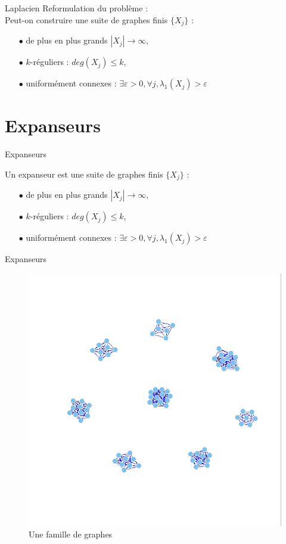 \begin{frame}{Laplacien}
Reformulation du problème :\\
Peut-on construire une suite de graphes finis $\{X_j\}$ :
\begin{itemize}
\item[$\bullet$] de plus en plus grands $|X_j|\rightarrow \infty$,
\item[$\bullet$] $k$-réguliers : $deg(X_j)\leq k$,
\item[$\bullet$] uniformément connexes : $\exists\varepsilon>0, \forall j, \lambda_1(X_j)>\varepsilon$ 
\end{itemize}
\end{frame}


\section{Expanseurs}

\begin{frame}{Expanseurs}
\begin{defn}
Un expanseur est une suite de graphes finis $\{X_j\}$ :
\begin{itemize}
\item[$\bullet$] de plus en plus grands $|X_j|\rightarrow \infty$,
\item[$\bullet$] $k$-réguliers : $deg(X_j)\leq k$,
\item[$\bullet$] uniformément connexes : $\exists\varepsilon>0, \forall j, \lambda_1(X_j)>\varepsilon$ 
\end{itemize}
\end{defn}
\end{frame}

\begin{frame}{Expanseurs}
\begin{figure}\includegraphics[scale=0.25]{Graphs5.png}\caption{Une famille de graphes}\end{figure}
\end{frame}

